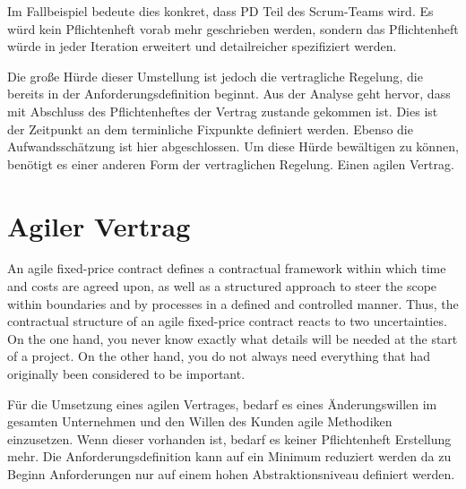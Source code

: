Im Fallbeispiel bedeute dies konkret, dass \ac{PD} Teil des Scrum-Teams wird. Es würd kein Pflichtenheft vorab mehr geschrieben werden, sondern das Pflichtenheft würde in jeder Iteration erweitert und detailreicher spezifiziert werden.

Die große Hürde dieser Umstellung ist jedoch die vertragliche Regelung, die bereits in der Anforderungsdefinition beginnt. Aus der Analyse geht hervor, dass mit Abschluss des Pflichtenheftes der Vertrag zustande gekommen ist. Dies ist der Zeitpunkt an dem terminliche Fixpunkte definiert werden. Ebenso die Aufwandsschätzung ist hier abgeschlossen. Um diese Hürde bewältigen zu können, benötigt es einer anderen Form der vertraglichen Regelung. Einen agilen Vertrag.

\section{Agiler Vertrag}

An agile fixed-price contract defines a contractual framework within which time and costs are agreed upon, as well as a structured approach to steer the scope within boundaries and by processes in a defined and controlled manner. Thus, the contractual structure of an agile fixed-price contract reacts to two uncertainties. On the one hand, you never know exactly what details will be needed at the start of a project. On the other hand, you do not always need everything that had originally been considered to be important. \parencite[S. 47]{Opelt:2013}

Für die Umsetzung eines agilen Vertrages, bedarf es eines Änderungswillen im gesamten Unternehmen und den Willen des Kunden agile Methodiken einzusetzen. Wenn dieser vorhanden ist, bedarf es keiner Pflichtenheft Erstellung mehr. Die Anforderungsdefinition kann auf ein Minimum reduziert werden da zu Beginn Anforderungen nur auf einem hohen Abstraktionsniveau definiert werden.

\chapterend